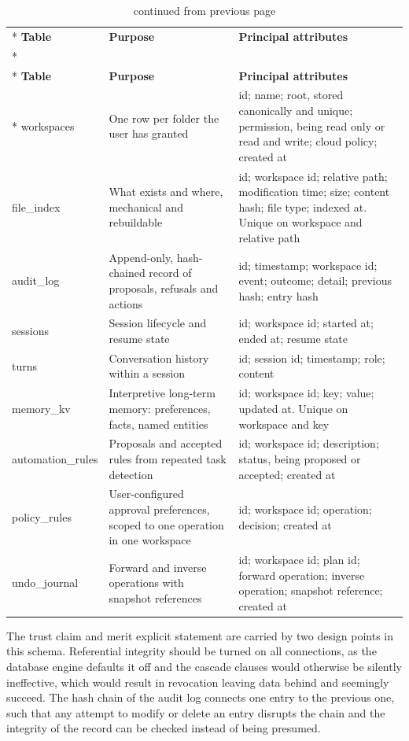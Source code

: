 \documentclass{FastFyp}
\begin{document}
{\small
{}
\begin{longtable}{|p{2.6cm}|p{4.0cm}|p{6.2cm}|}
\caption{Data dictionary of the relational system of record.}\label{tab:datadict}\\*
\hline
\textbf{Table} & \textbf{Purpose} & \textbf{Principal attributes} \\*
\hline
\endfirsthead
\caption[]{continued from previous page}\\*
\hline
\textbf{Table} & \textbf{Purpose} & \textbf{Principal attributes} \\*
\hline
\endhead
\hline
workspaces & One row per folder the user has granted & id; name; root, stored canonically and unique; permission, being read only or read and write; cloud policy; created at \\
\hline
file\_index & What exists and where, mechanical and rebuildable & id; workspace id; relative path; modification time; size; content hash; file type; indexed at. Unique on workspace and relative path \\
\hline
audit\_log & Append-only, hash-chained record of proposals, refusals and actions & id; timestamp; workspace id; event; outcome; detail; previous hash; entry hash \\
\hline
sessions & Session lifecycle and resume state & id; workspace id; started at; ended at; resume state \\
\hline
turns & Conversation history within a session & id; session id; timestamp; role; content \\
\hline
memory\_kv & Interpretive long-term memory: preferences, facts, named entities & id; workspace id; key; value; updated at. Unique on workspace and key \\
\hline
automation\_rules & Proposals and accepted rules from repeated task detection & id; workspace id; description; status, being proposed or accepted; created at \\
\hline
policy\_rules & User-configured approval preferences, scoped to one operation in one workspace & id; workspace id; operation; decision; created at \\
\hline
undo\_journal & Forward and inverse operations with snapshot references & id; workspace id; plan id; forward operation; inverse operation; snapshot reference; created at \\
\hline
\end{longtable}
}

The trust claim and merit explicit statement are carried by two design points in this schema. Referential integrity should be turned on all connections, as the database engine defaults it off and the cascade clauses would otherwise be silently ineffective, which would result in revocation leaving data behind and seemingly succeed. The hash chain of the audit log connects one entry to the previous one, such that any attempt to modify or delete an entry disrupts the chain and the integrity of the record can be checked instead of being presumed.
\end{document}
